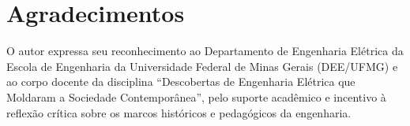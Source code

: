 \section*{Agradecimentos}
O autor expressa seu reconhecimento ao Departamento de Engenharia Elétrica da Escola de Engenharia da Universidade Federal de Minas Gerais (DEE/UFMG) e ao corpo docente da disciplina ``Descobertas de Engenharia Elétrica que Moldaram a Sociedade Contemporânea'', pelo suporte acadêmico e incentivo à reflexão crítica sobre os marcos históricos e pedagógicos da engenharia.

